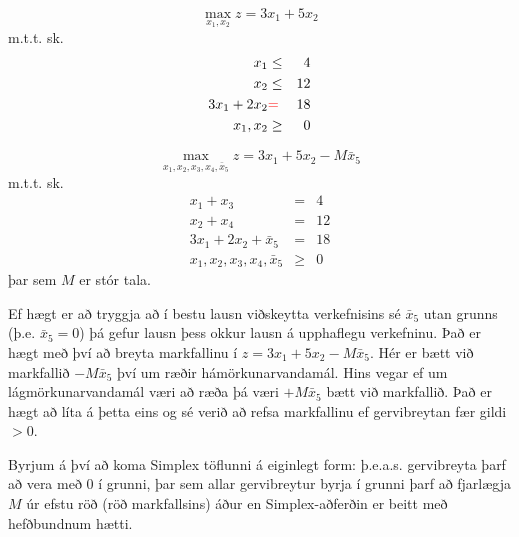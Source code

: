 \begin{daemi}\label{daemi:wyndor-jofnusk}
$$\max_{x_1,x_2}  z = 3x_1 + 5 x_2  $$
m.t.t. sk.
\begin{eqnarray*}
x_1 & \le&   4 \\
x_2 &\le&  12 \\
3x_1 + 2 x_2 & \color{red}{=} &   18 \\
x_1, x_2 &\ge& 0  
\end{eqnarray*}
\end{daemi}
\begin{lausn}
$$\max_{x_1,x_2,x_3,x_4,\bar{x}_5}  z = 3x_1 + 5 x_2 - M \bar{x}_5 $$
m.t.t. sk.
\begin{eqnarray*}
x_1 + x_3 & = &  4 \\
x_2 + x_4 & = & 12 \\
3x_1 + 2 x_2 + \bar{x}_5  & = &  18 \\
x_1, x_2, x_3, x_4, \bar{x}_5 &\ge &0   
\end{eqnarray*}
þar sem $M$ er stór tala. 

\begin{aths}
Ef hægt er að tryggja að í bestu lausn
viðskeytta verkefnisins sé $\bar{x}_5$ utan grunns (þ.e.
$\bar{x}_5=0$) þá gefur lausn þess okkur lausn á upphaflegu
verkefninu. Það er hægt með því að breyta markfallinu í $ z =
3x_1 + 5 x_2 - M \bar{x}_5$.  Hér er bætt við markfallið
$-M\bar{x}_5$ því um ræðir hámörkunarvandamál. Hins vegar ef um
lágmörkunarvandamál væri að ræða þá væri $+ M \bar{x}_5$ bætt
við markfallið. Það er hægt að líta á þetta eins og sé verið að
refsa markfallinu ef gervibreytan fær gildi $>0$.
\end{aths}
Byrjum á því að koma Simplex töflunni á eiginlegt form: þ.e.a.s. gervibreyta þarf að vera með $0$ í
grunni, þar sem allar gervibreytur byrja í grunni þarf að fjarlægja $M$ úr efstu röð (röð markfallsins) áður en
Simplex-aðferðin er beitt með hefðbundnum hætti.


\end{lausn}
